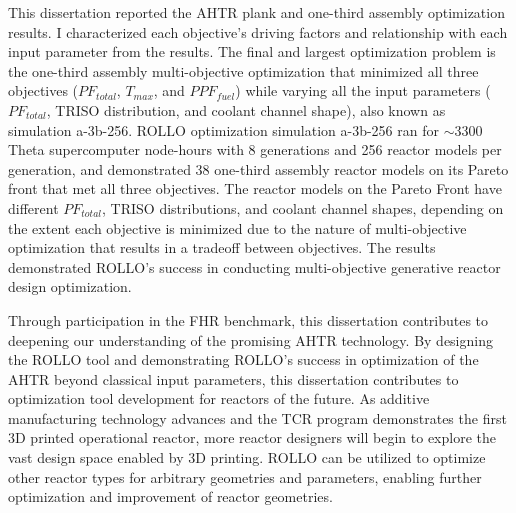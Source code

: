 This dissertation reported the \gls{AHTR} plank and one-third assembly optimization 
results. 
I characterized each objective's driving factors and relationship with each input 
parameter from the results. 
The final and largest optimization problem is the one-third assembly multi-objective 
optimization that minimized all three objectives ($PF_{total}$, $T_{max}$, and 
$PPF_{fuel}$) while varying all the input parameters ($PF_{total}$, TRISO distribution, 
and coolant channel shape), also known as simulation a-3b-256. 
\gls{ROLLO} optimization simulation a-3b-256 ran for $\sim 3300$ Theta supercomputer 
node-hours with 8 generations and 256 reactor models per generation, and 
demonstrated 38 one-third assembly reactor models on its Pareto front that met all 
three objectives. 
The reactor models on the Pareto Front have different $PF_{total}$, TRISO distributions, 
and coolant channel shapes, depending on the extent each objective is minimized due 
to the nature of multi-objective optimization that results in a tradeoff between 
objectives. 
The results demonstrated \gls{ROLLO}'s success in conducting multi-objective generative 
reactor design optimization. 

Through participation in the \gls{FHR} benchmark, this dissertation contributes to 
deepening our understanding of the promising \gls{AHTR} technology. 
By designing the \gls{ROLLO} tool and demonstrating \gls{ROLLO}'s success in 
optimization of the \gls{AHTR} beyond classical input parameters, this dissertation 
contributes to optimization tool development for reactors of the future. 
As additive manufacturing technology advances and the \gls{TCR} program 
demonstrates the first 3D printed operational reactor, more reactor designers 
will begin to explore the vast design space enabled by 3D printing. 
\gls{ROLLO} can be utilized to optimize other reactor types for arbitrary
geometries and parameters, enabling further optimization and improvement of reactor 
geometries.